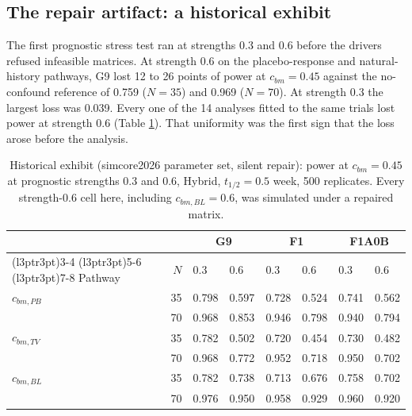 \documentclass[
  11pt,
]{article}
\begin{document}
\subsection{The repair artifact: a historical exhibit}\label{sec-artifact}


The first prognostic stress test ran at strengths 0.3 and 0.6 before
the drivers refused infeasible matrices. At strength 0.6 on the
placebo-response and natural-history pathways, G9 lost
12 to 26 points of power at \(c_{bm} = 0.45\) against the
no-confound reference of 0.759 (\(N = 35\)) and
0.969 (\(N = 70\)). At strength 0.3 the largest loss was
0.039. Every one of the 14 analyses fitted
to the same trials lost power at strength 0.6 (Table
\ref{tab:tab-hist}). That uniformity was the first sign that the
loss arose before the analysis.

\begin{table}
\centering
\caption{\label{tab:tab-hist}Historical exhibit (simcore2026 parameter set,
      silent repair): power at $c_{bm} = 0.45$ at prognostic
      strengths 0.3 and 0.6, Hybrid, $t_{1/2} = 0.5$ week, 500
      replicates. Every strength-0.6 cell here, including
      $c_{bm,BL} = 0.6$, was simulated under a repaired matrix.}
\centering
\fontsize{9}{11}\selectfont
\begin{tabular}[t]{lrllllll}
\toprule
\multicolumn{2}{c}{ } & \multicolumn{2}{c}{G9} & \multicolumn{2}{c}{F1} & \multicolumn{2}{c}{F1A0B} \\
\cmidrule(l{3pt}r{3pt}){3-4} \cmidrule(l{3pt}r{3pt}){5-6} \cmidrule(l{3pt}r{3pt}){7-8}
Pathway & $N$ & 0.3 & 0.6 & 0.3 & 0.6 & 0.3 & 0.6\\
\midrule
$c_{bm,PB}$ & 35 & 0.798 & 0.597 & 0.728 & 0.524 & 0.741 & 0.562\\
 & 70 & 0.968 & 0.853 & 0.946 & 0.798 & 0.940 & 0.794\\
$c_{bm,TV}$ & 35 & 0.782 & 0.502 & 0.720 & 0.454 & 0.730 & 0.482\\
 & 70 & 0.968 & 0.772 & 0.952 & 0.718 & 0.950 & 0.702\\
$c_{bm,BL}$ & 35 & 0.782 & 0.738 & 0.713 & 0.676 & 0.758 & 0.702\\
 & 70 & 0.976 & 0.950 & 0.958 & 0.929 & 0.960 & 0.920\\
\bottomrule
\end{tabular}
\end{table}
\end{document}
